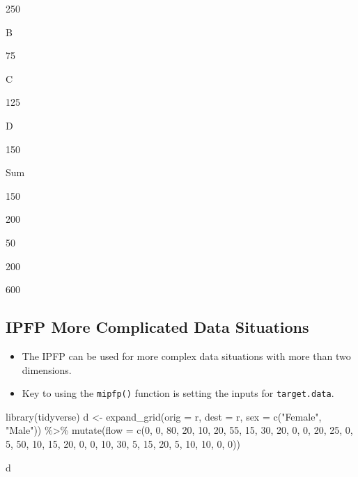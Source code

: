 \documentclass[
]{book}
\newenvironment{Shaded}{\begin{snugshade}}{\end{snugshade}}
\newcommand{\AttributeTok}[1]{\textcolor[rgb]{0.77,0.63,0.00}{#1}}
\newcommand{\DecValTok}[1]{\textcolor[rgb]{0.00,0.00,0.81}{#1}}
\newcommand{\FunctionTok}[1]{\textcolor[rgb]{0.00,0.00,0.00}{#1}}
\newcommand{\NormalTok}[1]{#1}
\newcommand{\OtherTok}[1]{\textcolor[rgb]{0.56,0.35,0.01}{#1}}
\newcommand{\SpecialCharTok}[1]{\textcolor[rgb]{0.00,0.00,0.00}{#1}}
\newcommand{\StringTok}[1]{\textcolor[rgb]{0.31,0.60,0.02}{#1}}
\providecommand{\tightlist}{%
  \setlength{\itemsep}{0pt}\setlength{\parskip}{0pt}}
\begin{document}
250

B

75

C

125

D

150

Sum

150

200

50

200

600

\hypertarget{ipfp-more-complicated-data-situations}{%
\subsection{IPFP More Complicated Data Situations}\label{ipfp-more-complicated-data-situations}}

\begin{itemize}
\tightlist
\item
  The IPFP can be used for more complex data situations with more than two dimensions.
\item
  Key to using the \texttt{mipfp()} function is setting the inputs for \texttt{target.data}.
\end{itemize}

\begin{Shaded}
\begin{Highlighting}[]
\FunctionTok{library}\NormalTok{(tidyverse)}
\NormalTok{d }\OtherTok{\textless{}{-}} \FunctionTok{expand\_grid}\NormalTok{(}\AttributeTok{orig =}\NormalTok{ r, }\AttributeTok{dest =}\NormalTok{ r, }\AttributeTok{sex =} \FunctionTok{c}\NormalTok{(}\StringTok{"Female"}\NormalTok{, }\StringTok{"Male"}\NormalTok{)) }\SpecialCharTok{\%\textgreater{}\%}
  \FunctionTok{mutate}\NormalTok{(}\AttributeTok{flow =} \FunctionTok{c}\NormalTok{(}\DecValTok{0}\NormalTok{, }\DecValTok{0}\NormalTok{, }\DecValTok{80}\NormalTok{, }\DecValTok{20}\NormalTok{, }\DecValTok{10}\NormalTok{, }\DecValTok{20}\NormalTok{, }\DecValTok{55}\NormalTok{, }\DecValTok{15}\NormalTok{, }\DecValTok{30}\NormalTok{, }\DecValTok{20}\NormalTok{, }\DecValTok{0}\NormalTok{, }\DecValTok{0}\NormalTok{, }\DecValTok{20}\NormalTok{, }\DecValTok{25}\NormalTok{, }\DecValTok{0}\NormalTok{, }\DecValTok{5}\NormalTok{, }\DecValTok{50}\NormalTok{, }\DecValTok{10}\NormalTok{, }\DecValTok{15}\NormalTok{, }\DecValTok{20}\NormalTok{, }\DecValTok{0}\NormalTok{, }\DecValTok{0}\NormalTok{, }\DecValTok{10}\NormalTok{, }\DecValTok{30}\NormalTok{, }\DecValTok{5}\NormalTok{, }\DecValTok{15}\NormalTok{, }\DecValTok{20}\NormalTok{, }\DecValTok{5}\NormalTok{, }\DecValTok{10}\NormalTok{, }\DecValTok{10}\NormalTok{, }\DecValTok{0}\NormalTok{, }\DecValTok{0}\NormalTok{))}

\NormalTok{d}
\end{Highlighting}
\end{Shaded}
\end{document}
